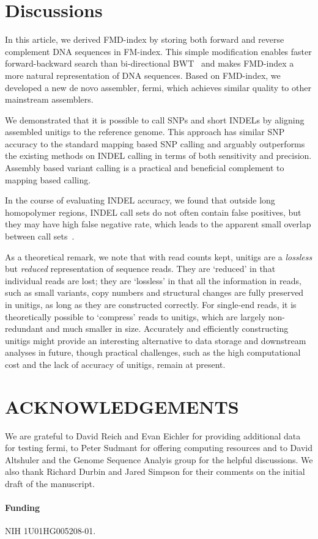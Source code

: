 \documentclass{bioinfo}
\begin{document}
\vspace*{-1em}

\section{Discussions}
In this article, we derived FMD-index by storing both forward and reverse
complement DNA sequences in FM-index. This simple modification enables faster
forward-backward search than bi-directional BWT~\citep{Lam:2009fk} and makes
FMD-index a more natural representation of DNA sequences. Based on FMD-index,
we developed a new de novo assembler, fermi, which achieves similar quality
to other mainstream assemblers.

We demonstrated that it is possible to call SNPs and short INDELs by aligning
assembled unitigs to the reference genome. This approach has similar SNP
accuracy to the standard mapping based SNP calling and arguably outperforms
the existing methods on INDEL calling in terms of both sensitivity and
precision. Assembly based variant calling is a practical and beneficial
complement to mapping based calling.

In the course of evaluating INDEL accuracy, we found that outside long
homopolymer regions, INDEL call sets do not often contain false positives, but
they may have high false negative rate, which leads to the apparent small
overlap between call sets~\citep{Lam:2012fk}.

As a theoretical remark, we note that with read counts kept, unitigs are a
\emph{lossless} but \emph{reduced} representation of sequence reads. They are
`reduced' in that individual reads are lost; they are `lossless' in that all
the information in reads, such as small variants, copy numbers and structural
changes are fully preserved in unitigs, as long as they are constructed
correctly. For single-end reads, it is theoretically possible to `compress'
reads to unitigs, which are largely non-redundant and much smaller in size.
Accurately and efficiently constructing unitigs might provide an interesting
alternative to data storage and downstream analyses in future, though practical
challenges, such as the high computational cost and the lack of accuracy of
unitigs, remain at present.

\vspace*{-1em}

\section*{ACKNOWLEDGEMENTS}
We are grateful to David Reich and Evan Eichler for providing additional data
for testing fermi, to Peter Sudmant for offering computing resources and
to David Altshuler and the Genome Sequence Analyis group for the helpful
discussions. We also thank Richard Durbin and Jared Simpson for their
comments on the initial draft of the manuscript.

\paragraph{Funding\textcolon} NIH 1U01HG005208-01.

\end{document}

